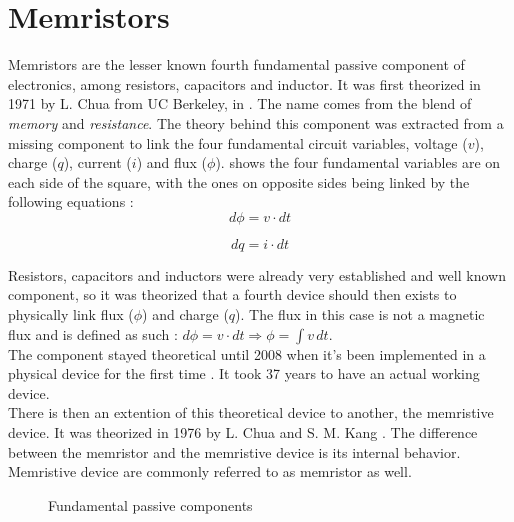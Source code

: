 \section{Memristors}
\label{sec:memristors}

Memristors are the lesser known fourth fundamental passive component of electronics, among resistors, capacitors and inductor.
It was first theorized in 1971 by L. Chua from UC Berkeley, in \cite{TheoMemristor}. The name comes from the blend of \textit{memory} and \textit{resistance}.
The theory behind this component was extracted from a missing component to link the four fundamental circuit variables, voltage ($v$), charge ($q$), current ($i$) and flux ($\phi$).  shows the four fundamental variables are on each side of the square, with the ones on opposite sides being linked by the following equations :
\begin{equation}
  d\phi = v\cdot dt
\end{equation}

\begin{equation}
  dq = i\cdot dt
\end{equation}

Resistors, capacitors and inductors were already very established and well known component, so it was theorized that a fourth device should then exists to physically link flux ($\phi$) and charge ($q$).  The flux in this case is not a magnetic flux and is defined as such : $ d\phi=v\cdot dt \Rightarrow \phi =  \int v \,dt  $.\\
The component stayed theoretical until 2008 when it's been implemented in a physical device for the first time \cite{memristorFab}. It took 37 years to have an actual working device.\\
There is then an extention of this theoretical device to another, the memristive device. It was theorized in 1976 by L. Chua and S. M. Kang \cite{memrestiveDev}. The difference between the memristor and the memristive device is its internal behavior. Memristive device are commonly referred to as memristor as well.

\begin{figure}[H]
  \centering
  
  \caption{Fundamental passive components}
  \label{fig:fundComp}
\end{figure}


